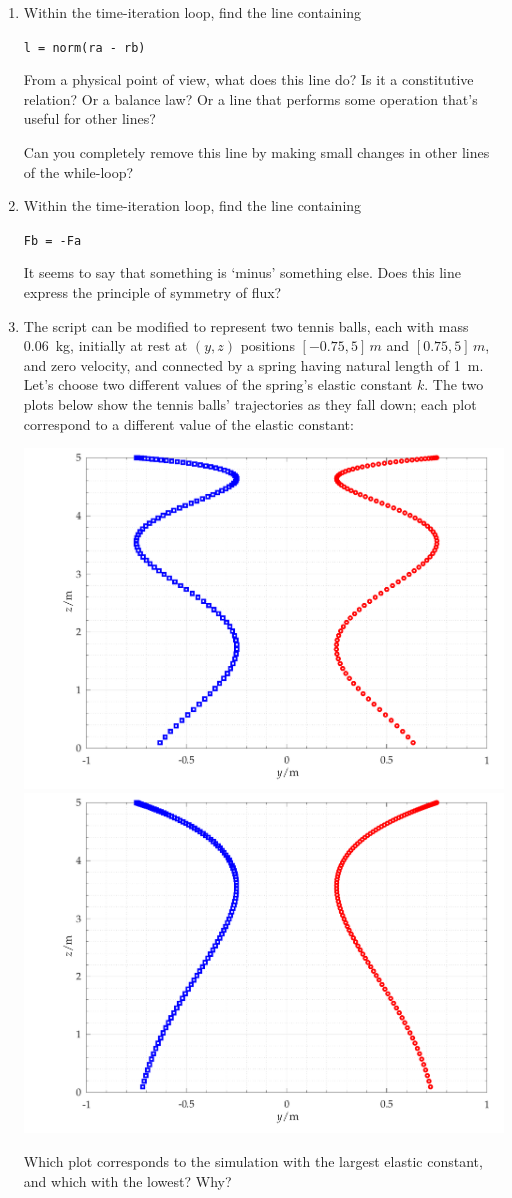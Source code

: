 \documentclass[a4paper,12pt,%
onecolumn,oneside,%
british%
]{memoir}
\renewcommand*{\|}[1][]{\nonscript\:#1\vert\nonscript\:\mathopen{}}
\begin{document}
\begin{enumerate}[exerc]
\item Within the time-iteration loop, find the line containing
  \vspace{-1em}
  \begin{center}
    \verb|l = norm(ra - rb)|
  \end{center}
  \vspace{-1em}
From a physical point of view, what does this line do? Is it a constitutive relation? Or a balance law? Or a line that performs some operation that's useful for other lines?

  Can you completely remove this line by making small changes in other lines of the while-loop?

\item Within the time-iteration loop, find the line containing
  \vspace{-1em}
  \begin{center}
    \verb|Fb = -Fa|
  \end{center}
  \vspace{-1em}
  It seems to say that something is \enquote*{minus} something else. Does this line express the principle of symmetry of flux?

\item The script can be modified to represent two tennis balls, each with mass \qty{0.06}{kg}, initially at rest at $(y,z)$ positions $[-0.75, 5]\,\unit{m}$ and $[0.75, 5]\,\unit{m}$, and zero velocity, and connected by a spring having natural length of \qty{1}{m}. Let's choose two different values of the spring's elastic constant $k$. The two plots below show the tennis balls' trajectories as they fall down; each plot correspond to a different value of the elastic constant:
  \begin{center}
\includegraphics[width=0.495\linewidth]{images/spring_const1.pdf}%
\hfill\includegraphics[width=0.495\linewidth]{images/spring_const2.pdf}%
  \end{center}
Which plot corresponds to the simulation with the largest elastic constant, and which with the lowest? Why?
\end{enumerate}
\end{document}
